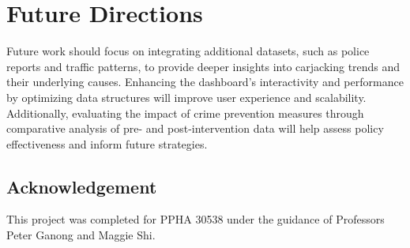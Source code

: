 \documentclass[
  9pt,
  letterpaper,
  DIV=11,
  numbers=noendperiod]{scrartcl}
\begin{document}
\section{Future Directions}\label{future-directions}

Future work should focus on integrating additional datasets, such as
police reports and traffic patterns, to provide deeper insights into
carjacking trends and their underlying causes. Enhancing the dashboard's
interactivity and performance by optimizing data structures will improve
user experience and scalability. Additionally, evaluating the impact of
crime prevention measures through comparative analysis of pre- and
post-intervention data will help assess policy effectiveness and inform
future strategies.

\subsection{Acknowledgement}\label{acknowledgement}

This project was completed for PPHA 30538 under the guidance of
Professors Peter Ganong and Maggie Shi.
\end{document}
